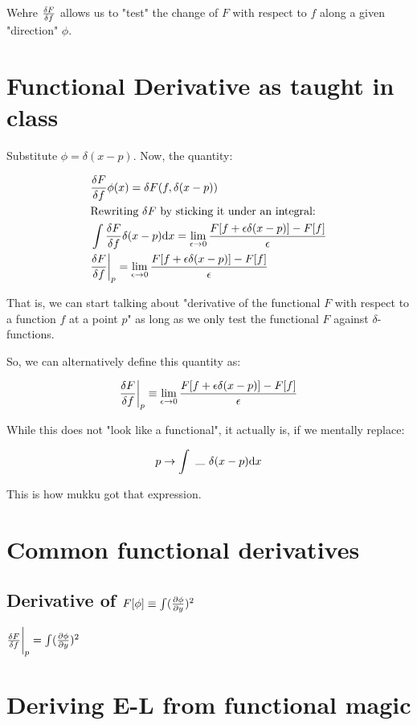 Wehre $\fdv{F}{f}$ allows us to "test" the change of $F$ with respect to $f$
along a given "direction" $\phi$.

\section{Functional Derivative as taught in class}

Substitute $\phi = \delta (x - p)$. Now, the quantity:

\begin{align*}
    &\fdv{F}{f}(x) \phi(x) =
    \delta F (f, \delta (x - p))  \\
    &\text{Rewriting $\delta F$ by sticking it under an integral:} \\
    &\int \fdv{F}{f} (x) \delta (x - p) \dd x =  
    \lim_{\epsilon \to 0}
    \frac{F[f + \epsilon \delta (x - p)] - F[f]}{\epsilon}  \\
    & \fdv{F}{f}{\bigg \rvert_p} = 
    \lim_{\epsilon \to 0}
    \frac{F[f + \epsilon \delta (x - p)] - F[f]}{\epsilon}
\end{align*}

That is, we can start talking about "derivative of the functional $F$ with
respect to a function $f$ at a point $p$" as long as we only test the functional $F$ against
$\delta$-functions.

So, we can alternatively define this quantity as:

\begin{align*}
\fdv{F}{f}{\bigg \rvert_p} \equiv 
\lim_{\epsilon \to 0} \frac{F[f + \epsilon \delta (x - p)] - F[f]}{\epsilon}
\end{align*}

While this does not "look like a functional", it actually is, if we
mentally replace:

\begin{align*}
    p \to  \int ~\rule{0.3cm}{0.1mm}~\delta (x - p) \dd x
\end{align*}

This is how mukku got that expression.

\section{Common functional derivatives}

\subsection{Derivative of $F[\phi] \equiv \int (\pdv{\phi}{y})^2$}

$\fdv{F}{f}{\bigg \rvert_p} = \int (\pdv{\phi}{y})^2$


\section{Deriving E-L from functional magic}

